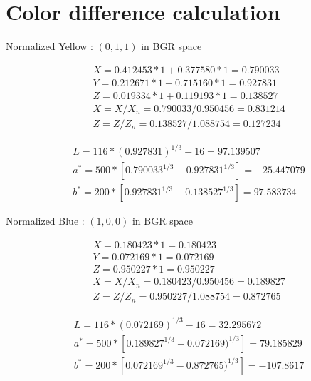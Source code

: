 \documentclass[12pt]{article}
\begin{document}
\section{Color difference calculation}



Normalized Yellow : $(0,1,1)$ in BGR space

\begin{equation}
\begin{split}
&X = 0.412453*1 + 0.377580 * 1 = 0.790033 \\
&Y = 0.212671*1 + 0.715160 * 1 = 0.927831 \\
&Z = 0.019334*1 + 0.119193 * 1 = 0.138527 \\
&X=X/X_n = 0.790033/0.950456 = 0.831214 \\
&Z=Z/Z_n = 0.138527/1.088754 = 0.127234
\end{split}
\end{equation}


\begin{equation}
\begin{split}
&L = 116*(0.927831)^{1/3}-16 = 97.139507 \\
&a^* = 500*[0.790033^{1/3}-0.927831^{1/3}]= -25.447079\\
&b^* = 200*[0.927831^{1/3}-0.138527^{1/3}] = 97.583734
\end{split}
\end{equation}

Normalized Blue : $(1,0,0)$ in BGR space

\begin{equation}
\begin{split}
&X = 0.180423*1 = 0.180423 \\
&Y = 0.072169*1 = 0.072169 \\
&Z = 0.950227*1 = 0.950227 \\
&X=X/X_n = 0.180423/0.950456 = 0.189827 \\
&Z=Z/Z_n = 0.950227/1.088754 = 0.872765
\end{split}
\end{equation}


\begin{equation}
\begin{split}
&L = 116*(0.072169)^{1/3}-16 = 32.295672 \\
&a^* = 500*[0.189827^{1/3}-0.072169)^{1/3}]= 79.185829\\
&b^* = 200*[0.072169^{1/3}-0.872765)^{1/3}] = -107.8617
\end{split}
\end{equation}
\end{document}

